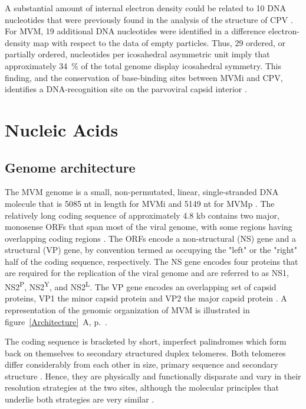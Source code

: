A substantial amount of internal electron density could be related to 10 DNA nucleotides that were previously found in the analysis of the structure of CPV \cite{pmid7735832, pmid1616694}. For MVM, 19 additional DNA nucleotides were identified in a difference electron-density map with respect to the data of empty particles. Thus, 29 ordered, or partially ordered, nucleotides per icosahedral asymmetric unit imply that approximately 34~\% of the total genome display icosahedral symmetry. This finding, and the conservation of base-binding sites between MVMi and CPV, identifies a DNA-recognition site on the parvoviral capsid interior \cite{pmid9817841}.    










\section{Nucleic Acids}

\subsection{Genome architecture}
\label{sec: Architecture}
The MVM genome is a small, non-permutated, linear, single-stranded DNA molecule \cite{pmid789912, pmid225040, Genome1, Genome2} that is 5085 nt in length for MVMi and 5149 nt for MVMp \cite{pmid3502703}. The relatively long coding sequence of approximately 4.8 kb contains two major, monosense ORFs that span most of the viral genome, with some regions having overlapping coding regions \cite{pmid6298737}. The ORFs encode a non-structural (NS) gene and a structural (VP) gene, by convention termed as occupying the "left" or the "right" half of the coding sequence, respectively. The NS gene encodes four proteins that are required for the replication of the viral genome and are referred to as NS1, NS2\textsuperscript{P}, NS2\textsuperscript{Y}, and NS2\textsuperscript{L}. The VP gene encodes an overlapping set of capsid proteins, VP1 the minor capsid protein and VP2 the major capsid protein \cite{pmid6828378, pmid2939261, pmid2942705}. A representation of the genomic organization of MVM is illustrated in figure~\ref{Architecture}~A, p.~\pageref{Architecture}.           

The coding sequence is bracketed by short, imperfect palindromes which form back on themselves to secondary structured duplex telomeres. Both telomeres differ considerably from each other in size, primary sequence and secondary structure \cite{pmid6298737}. Hence, they are physically and functionally disparate and vary in their resolution strategies at the two sites, although the molecular principles that underlie both strategies are very similar \cite{encapsidation}. 

